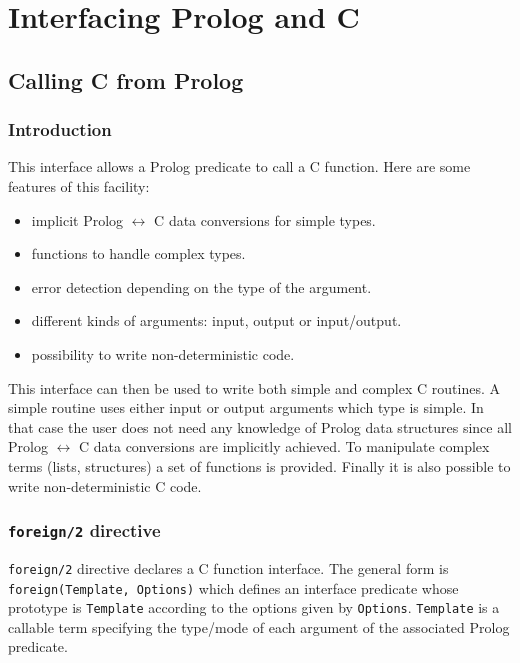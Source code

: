 \newpage
\section{Interfacing Prolog and C}
\label{Interfacing-Prolog-and-C}
\subsection{Calling C from Prolog}
\label{Calling-C-from-Prolog}

\subsubsection{Introduction}
This interface allows a Prolog predicate to call a C function. Here are some
features of this facility:

\begin{itemize}

\item implicit Prolog $\leftrightarrow$ C data conversions for simple types.

\item functions to handle complex types.

\item error detection depending on the type of the argument.

\item different kinds of arguments: input, output or input/output.

\item possibility to write non-deterministic code.

\end{itemize}

This interface can then be used to write both simple and complex C routines.
A simple routine uses either input or output arguments which type is simple.
In that case the user does not need any knowledge of Prolog data structures
since all Prolog $\leftrightarrow$ C data conversions are implicitly
achieved. To manipulate complex terms (lists, structures) a set of
functions is provided. Finally it is also possible to write
non-deterministic C code.

\subsubsection{\texttt{foreign/2} directive}
\label{foreign/2-directive}

\texttt{foreign/2} directive  declares a C function interface. The general form is
\texttt{foreign(Template, Options)} which defines an interface predicate
whose prototype is \texttt{Template} according to the options given by
\texttt{Options}. \texttt{Template} is a callable term specifying the
type/mode of each argument of the associated Prolog predicate.

